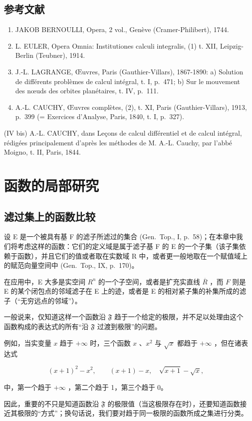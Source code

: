 \section*{参考文献}
{}

\begin{enumerate}
\def\labelenumi{(\Roman{enumi})}
\item
  JAKOB BERNOULLI, Opera, 2 vol., Genève (Cramer-Philibert), 1744.
\item
  L. EULER, Opera Omnia: Institutiones calculi integralis, (1) t. XII, Leipzig-Berlin (Teubner), 1914.
\item
  J.-L. LAGRANGE, Œuvres, Paris (Gauthier-Villars), 1867-1890: a) Solution de différents problèmes de calcul intégral, t. I, p.~471; b) Sur le mouvement des nœuds des orbites planétaires, t. IV, p.~111.
\item
  A.-L. CAUCHY, Œuvres complètes, (2), t. XI, Paris (Gauthier-Villars), 1913, p.~399 (= Exercices d'Analyse, Paris, 1840, t. I, p.~327).
\end{enumerate}

(IV bis) A.-L. CAUCHY, dans Leçons de calcul différentiel et de calcul intégral, rédigées principalement d'après les méthodes de M. A.-L. Cauchy, par l'abbé Moigno, t. II, Paris, 1844.

\chapter{函数的局部研究}

\section{滤过集上的函数比较}

设 E 是一个被具有基 F 的滤子所滤过的集合 (Gen.~Top., I, p.~58)；在本章中我们将考虑这样的函数：它们的定义域是属于滤子基 F 的 E 的一个子集（该子集依赖于函数），并且它们的值或者取在实数域 R 中，或者更一般地取在一个赋值域上的赋范向量空间中 (Gen.~Top., IX, p.~170)。

在应用中，E 大多是实空间 \(R^{n}\) 的一个子空间，或者是扩充实直线 \(\overline{R}\) ，而 \(F\) 则是 E 的某个闭包点的邻域滤子在 E 上的迹，或者是 E 的相对紧子集的补集所成的滤子（“无穷远点的邻域”）。

一般说来，仅知道这样一个函数沿 \(\mathfrak{F}\) 趋于一个给定的极限，并不足以处理由这个函数构成的表达式的所有“沿 \(\mathfrak{F}\) 过渡到极限”的问题。

例如，当实变量 \(x\) 趋于 \(+\infty\) 时，三个函数 \(x\) 、\(x^2\) 与 \(\sqrt{x}\) 都趋于 \(+\infty\) ，但在诸表达式

\[
(x + 1) ^ {2} - x ^ {2}, \qquad (x + 1) - x, \quad \sqrt {x + 1} - \sqrt {x},
\]

中，第一个趋于 \(+\infty\) ，第二个趋于 1，第三个趋于 0。

因此，重要的不只是知道函数沿 \(\mathfrak{F}\) 的极限值（当这极限存在时），还要知道函数接近其极限的“方式”；换句话说，我们要对趋于同一极限的函数所成之集进行分类。
